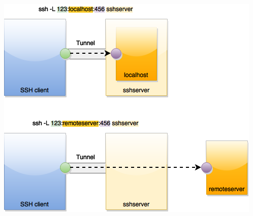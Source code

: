 \documentclass[handout]{beamer}
\begin{document}
\begin{frame}
\includegraphics[scale=0.55]{ssh-L-tunnel.png}\\
\end{frame}




\end{document}
